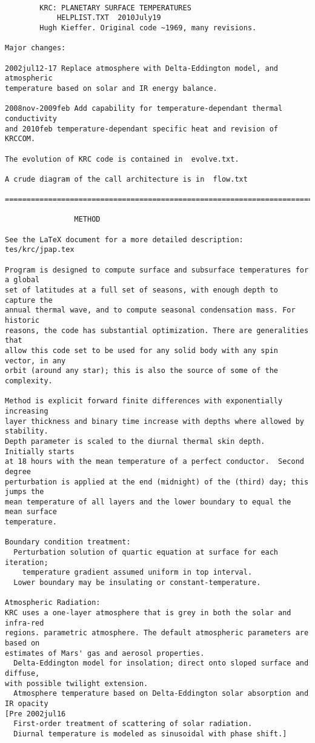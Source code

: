 \begin{verbatim}

 		KRC: PLANETARY SURFACE TEMPERATURES
			HELPLIST.TXT  2010July19
        Hugh Kieffer. Original code ~1969, many revisions.

Major changes:

2002jul12-17 Replace atmosphere with Delta-Eddington model, and atmospheric
temperature based on solar and IR energy balance. 

2008nov-2009feb Add capability for temperature-dependant thermal conductivity
and 2010feb temperature-dependant specific heat and revision of KRCCOM.

The evolution of KRC code is contained in  evolve.txt.

A crude diagram of the call architecture is in  flow.txt

================================================================================

				METHOD

See the LaTeX document for a more detailed description: tes/krc/jpap.tex

Program is designed to compute surface and subsurface temperatures for a global
set of latitudes at a full set of seasons, with enough depth to capture the
annual thermal wave, and to compute seasonal condensation mass. For historic
reasons, the code has substantial optimization. There are generalities that
allow this code set to be used for any solid body with any spin vector, in any
orbit (around any star); this is also the source of some of the complexity.
 
Method is explicit forward finite differences with exponentially increasing
layer thickness and binary time increase with depths where allowed by stability.
Depth parameter is scaled to the diurnal thermal skin depth.  Initially starts
at 18 hours with the mean temperature of a perfect conductor.  Second degree
perturbation is applied at the end (midnight) of the (third) day; this jumps the
mean temperature of all layers and the lower boundary to equal the mean surface
temperature.

Boundary condition treatment:
  Perturbation solution of quartic equation at surface for each iteration;
    temperature gradient assumed uniform in top interval.
  Lower boundary may be insulating or constant-temperature.

Atmospheric Radiation:
KRC uses a one-layer atmosphere that is grey in both the solar and infra-red
regions. parametric atmosphere. The default atmospheric parameters are based on
estimates of Mars' gas and aerosol properties.
  Delta-Eddington model for insolation; direct onto sloped surface and diffuse,
with possible twilight extension.
  Atmosphere temperature based on Delta-Eddington solar absorption and IR opacity
[Pre 2002jul16
  First-order treatment of scattering of solar radiation. 
  Diurnal temperature is modeled as sinusoidal with phase shift.]


\end{verbatim}
